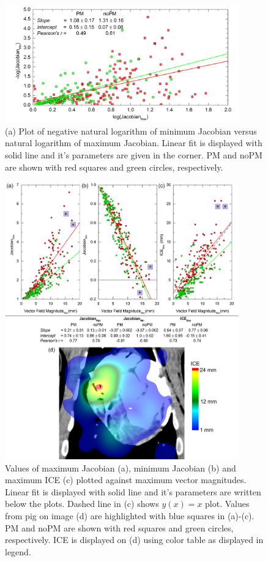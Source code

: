 \documentclass[type=dr, dr=rernat, accentcolor=tud7b,colorbacktitle, bigchapter, openright, twoside, 12pt ]{tudthesis}
\begin{document}
\begin{figure}[H]
	\begin{center}		
		\includegraphics[width=0.9\textwidth]{./Images/JacSum2.png}
		\caption{(a) Plot of negative natural logarithm of minimum Jacobian versus natural logarithm of maximum Jacobian. Linear fit is displayed with solid line and it's parameters are given in the corner. PM and noPM are shown with red squares and green circles, respectively.}
		\label{calcJac_pigs}
	\end{center}
\end{figure}

\begin{figure}[H]
	\begin{center}		
		\includegraphics[width=0.9\textwidth]{./Images/MaxVfdata_pigs.png}
		\caption{Values of maximum Jacobian (a), minimum Jacobian (b) and maximum ICE (c) plotted against maximum vector magnitudes. Linear fit is displayed with solid line and it's parameters are written below the plots. Dashed line in (c) shows $y(x)= x$ plot. Values from pig on image (d) are highlighted with blue squares in (a)-(c). PM and noPM are shown with red squares and green circles, respectively.
			ICE is displayed on (d) using color table as displayed in legend.}
		\label{maxvf_pigs}
	\end{center}
\end{figure}
\end{document}
